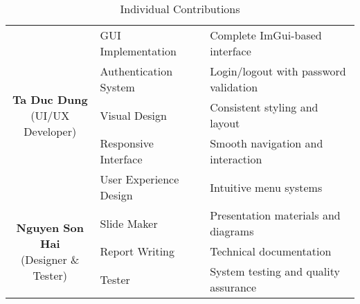 \begin{center}
\begin{table}[H]
\begin{tabularx}{\textwidth}{| c | l | X |}
            \multirow{5}{*}{\parbox{3.5cm}{\centering\textbf{Ta Duc Dung}\\ \small{(UI/UX Developer)}}}
            & GUI Implementation & Complete ImGui-based interface \\
            \cline{2-3}
             & Authentication System & Login/logout with password validation \\
            \cline{2-3}
             & Visual Design & Consistent styling and layout \\
            \cline{2-3}
             & Responsive Interface & Smooth navigation and interaction \\
            \cline{2-3}
             & User Experience Design & Intuitive menu systems \\
            \hline

            \multirow{4}{*}{\parbox{3.5cm}{\centering\textbf{Nguyen Son Hai}\\ \small{(Designer \& Tester)}}}
            & Slide Maker & Presentation materials and diagrams \\
            \cline{2-3}
             & Report Writing & Technical documentation \\
            \cline{2-3}
             & Tester & System testing and quality assurance \\
            \hline
        \end{tabularx}
        \caption{Individual Contributions}
    \end{table}
\end{center}

\newpage

